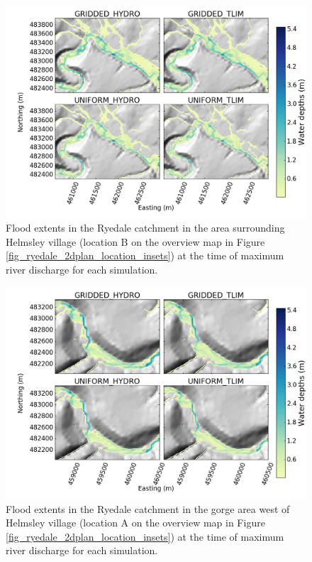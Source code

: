\begin{figure}
\includegraphics[width=20cm]{chp_flood_figs_scripts/fig_ryedale_flood_ensemble_helmsely.png}
\caption{Flood extents in the Ryedale catchment in the area surrounding Helmsley village (location B on the overview map in Figure \ref{fig_ryedale_2dplan_location_insets}) at the time of maximum river discharge for each simulation.}
\label{fig_ryedale_2dplan_flood_ensemble_town}
\end{figure}

\begin{figure}
\includegraphics[width=20cm]{chp_flood_figs_scripts/fig_ryedale_flood_ensemble_upstream.png}
\caption{Flood extents in the Ryedale catchment in the gorge area west of Helmsley village (location A on the overview map in Figure \ref{fig_ryedale_2dplan_location_insets}) at the time of maximum river discharge for each simulation.}
\label{fig_ryedale_2dplan_flood_ensemble_upstream}
\end{figure}

